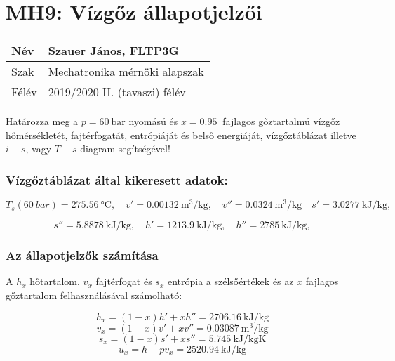\section*{MH9: Vízgőz állapotjelzői}
\begin{tabular}{ | p{2cm} | p{14cm} | } 
	\hline
	Név & Szauer János, FLTP3G \\ 
	\hline
	Szak & Mechatronika mérnöki alapszak \\ 
	\hline
	Félév & 2019/2020 II. (tavaszi) félév \\ 
	\hline
\end{tabular}
\vspace{2mm}

\noindent
Határozza meg a $p = \SI{60}{\bar}$ nyomású és $x = \SI{0,95}{}$ fajlagos gőztartalmú vízgőz hőmérsékletét, fajtérfogatát, entrópiáját és belső energiáját, vízgőztáblázat illetve $i-s$, vagy $T-s$ diagram segítségével!

\subsubsection{Vízgőztáblázat által kikeresett adatok:}
\begin{equation*}
	T_s(\SI{60}{bar}) = \SI{275,56}{\celsius},
	\quad
	v' = \SI{0.00132}{\meter\cubed\per\kilogram},
	\quad
	v'' = \SI{0.0324}{\meter\cubed\per\kilogram}
	\quad
	s' = \SI{3.0277}{\kilo\joule\per\kilogram}, 
\end{equation*}
	
\begin{equation*}
	s'' = \SI{5.8878}{\kilo\joule\per\kilogram},
	\quad
	h' = \SI{1213.9}{\kilo\joule\per\kilogram}, 
	\quad
	h'' = \SI{2785}{\kilo\joule\per\kilogram},
\end{equation*}

\noindent\hrulefill

\subsubsection{Az állapotjelzők számítása}
A  $h_x$ hőtartalom, $v_x$ fajtérfogat és $s_x$ entrópia a szélsőértékek és az $x$ fajlagos gőztartalom felhasználásával számolható:

\begin{equation*}
	h_x = \left(1 - x\right) h' + x h'' = \SI{2706.16}{\kilo\joule\per\kilogram}
\end{equation*}
\begin{equation*}
	v_x = \left(1 - x\right) v' + x v'' = \SI{0.03087}{\meter\cubed\per\kilogram}
\end{equation*}
\begin{equation*}
	s_x = \left(1 - x\right) s' + x s'' = \SI{5.745}{\kilo\joule\per\kilogram\kelvin}
\end{equation*}
\begin{equation*}
	 u_x = h - p v_x = \SI{2520.94}{\kilo\joule\per\kilogram}
\end{equation*}


\pagebreak

